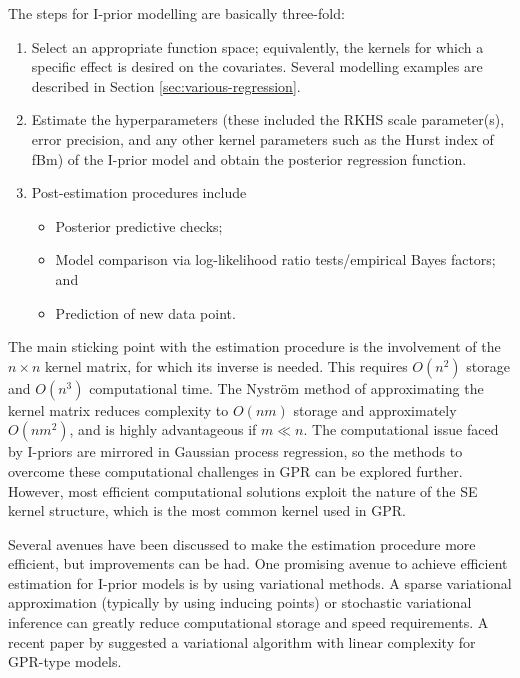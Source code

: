 \documentclass[a4paper,showframe,11pt]{report}
\begin{document}
The steps for I-prior modelling are basically three-fold:
\begin{enumerate}
  \item Select an appropriate function space; equivalently, the kernels for which a specific effect is desired on the covariates. Several modelling examples are described in Section \ref{sec:various-regression}.
  \item Estimate the hyperparameters (these included the RKHS scale parameter(s), error precision, and any other kernel parameters such as the Hurst index of fBm) of the I-prior model and obtain the posterior regression function.
  \item Post-estimation procedures include
  \begin{itemize}
    \item Posterior predictive checks;
    \item Model comparison via log-likelihood ratio tests/empirical Bayes factors; and
    \item Prediction of new data point.
  \end{itemize}
\end{enumerate}

The main sticking point with the estimation procedure is the involvement of the $n\times n$ kernel matrix, for which its inverse is needed.
This requires $O(n^2)$ storage and $O(n^3)$ computational time.
The Nyström method of approximating the kernel matrix reduces complexity to $O(nm)$ storage and approximately $O(nm^2)$, and is highly advantageous if $m \ll n$.
The computational issue faced by I-priors are mirrored in Gaussian process regression, so the methods to overcome these computational challenges in GPR can be explored further.
However, most efficient computational solutions exploit the nature of the SE kernel structure, which is the most common kernel used in GPR.

Several avenues have been discussed to make the estimation procedure more efficient, but improvements can be had.
One promising avenue to achieve efficient estimation for I-prior models is by using variational methods.
A sparse variational approximation (typically by using inducing points) or stochastic variational inference can greatly reduce computational storage and speed requirements.
A recent paper by \citet{cheng2017variational} suggested a variational algorithm with linear complexity for GPR-type models.
\end{document}
